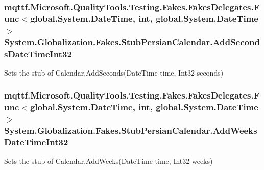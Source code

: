 \hypertarget{class_system_1_1_globalization_1_1_fakes_1_1_stub_persian_calendar_a0bed1c188748a8c81928d253deb8658c}{
\subsubsection[{Add\-Seconds\-Date\-Time\-Int32}]{\setlength{\rightskip}{0pt plus 5cm}mqttf.\-Microsoft.\-Quality\-Tools.\-Testing.\-Fakes.\-Fakes\-Delegates.\-Func$<$global.\-System.\-Date\-Time, int, global.\-System.\-Date\-Time$>$ System.\-Globalization.\-Fakes.\-Stub\-Persian\-Calendar.\-Add\-Seconds\-Date\-Time\-Int32}}\label{class_system_1_1_globalization_1_1_fakes_1_1_stub_persian_calendar_a0bed1c188748a8c81928d253deb8658c}


Sets the stub of Calendar.\-Add\-Seconds(\-Date\-Time time, Int32 seconds)

\hypertarget{class_system_1_1_globalization_1_1_fakes_1_1_stub_persian_calendar_a8b0011d7b1efe13a1a5a78e06b477b05}{
\subsubsection[{Add\-Weeks\-Date\-Time\-Int32}]{\setlength{\rightskip}{0pt plus 5cm}mqttf.\-Microsoft.\-Quality\-Tools.\-Testing.\-Fakes.\-Fakes\-Delegates.\-Func$<$global.\-System.\-Date\-Time, int, global.\-System.\-Date\-Time$>$ System.\-Globalization.\-Fakes.\-Stub\-Persian\-Calendar.\-Add\-Weeks\-Date\-Time\-Int32}}\label{class_system_1_1_globalization_1_1_fakes_1_1_stub_persian_calendar_a8b0011d7b1efe13a1a5a78e06b477b05}


Sets the stub of Calendar.\-Add\-Weeks(\-Date\-Time time, Int32 weeks)

